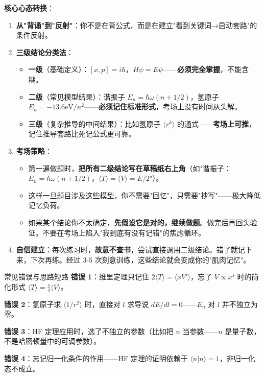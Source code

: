 \begin{thinkbox}
\textbf{核心心态转换}：
\begin{enumerate}[nosep]
\item \textbf{从"背诵"到"反射"}：你不是在背公式，而是在建立"看到关键词→启动套路"的条件反射。
\item \textbf{三级结论分类法}：
  \begin{itemize}[nosep]
  \item \textbf{一级}（基础定义）：$[x,p]=i\hbar$，$H\psi=E\psi$——\textbf{必须完全掌握}，不能含糊。
  \item \textbf{二级}（常见模型结果）：谐振子 $E_n=\hbar\omega(n+1/2)$，氢原子 $E_n=-13.6\text{eV}/n^2$——\textbf{必须记住标准形式}，考场上没有时间从头解。
  \item \textbf{三级}（复杂推导的中间结果）：比如氢原子 $\langle r^k\rangle$ 的通式——\textbf{考场上可推}，记住推导套路比死记公式更可靠。
  \end{itemize}
\item \textbf{考场策略}：
  \begin{itemize}[nosep]
  \item 第一遍做题时，\textbf{把所有二级结论写在草稿纸右上角}（如"谐振子：$E_n=\hbar\omega(n+1/2)$，$\langle T\rangle=\langle V\rangle=E/2$"）。
  \item 这样一旦题目涉及这些模型，你不需要"回忆"，只需要"抄写"——极大降低记忆负荷。
  \item 如果某个结论你不太确定，\textbf{先假设它是对的，继续做题}。做完后再回头验证。不要在考场上陷入"我到底有没有记错"的焦虑循环。
  \end{itemize}
\item \textbf{自信建立}：每次练习时，\textbf{故意不查书}，尝试直接调用二级结论。错了就记下来，下次再练。经过 3-5 次刻意训练，这些结论就会变成你的"肌肉记忆"。
\end{enumerate}
\end{thinkbox}

\begin{errorbox}[colback=white]{常见错误与思路短路}
\textbf{错误 1}：维里定理只记住 $2\langle T\rangle = \langle xV'\rangle$，忘了 $V \propto x^s$ 时的简化形式 $\langle T\rangle = \frac{s}{2}\langle V\rangle$。

\textbf{错误 2}：氢原子求 $\langle 1/r^2\rangle$ 时，直接对 $l$ 求导说 $dE/dl=0$——$E_n$ 对 $l$ 并不独立为零。

\textbf{错误 3}：HF 定理应用时，选了不独立的参数（比如把 $n$ 当参数——$n$ 是量子数，不是哈密顿量中的可调参数）。

\textbf{错误 4}：忘记归一化条件的作用——HF 定理的证明依赖于 $\langle n|n\rangle=1$，非归一化态不成立。
\end{errorbox}
